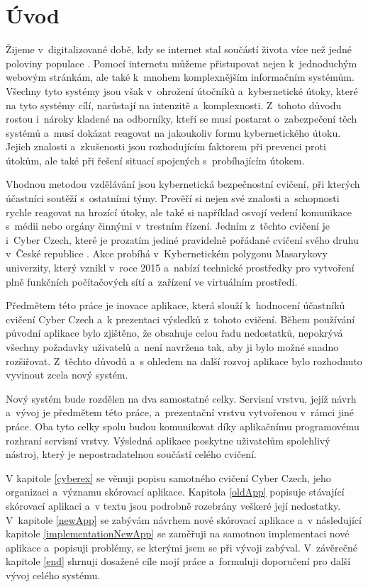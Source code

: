 \documentclass[
  digital,
  twoside,
  table, 
  nolof, 
  nolot
]{fithesis3}
\begin{document}
\chapter*{Úvod}

Žijeme v~digitalizované době, kdy se internet stal součástí života více než jedné poloviny populace \cite{worldStats}. Pomocí internetu můžeme přistupovat nejen k~jednoduchým webovým stránkám, ale také k~mnohem komplexnějším informačním systémům. Všechny tyto systémy jsou však v~ohrožení útočníků a~kybernetické útoky, které na tyto systémy cílí, narůstají na intenzitě a~komplexnosti. Z~tohoto důvodu rostou i~nároky kladené na odborníky, kteří se musí postarat o~zabezpečení těch systémů a~musí dokázat reagovat na jakoukoliv formu kybernetického útoku. Jejich znalosti a~zkušenosti jsou rozhodujícím faktorem při prevenci proti útokům, ale také při řešení situací spojených s~probíhajícím útokem.

Vhodnou metodou vzdělávání jsou kybernetická bezpečnostní cvičení, při kterých účastníci soutěží s~ostatními týmy. Prověří si nejen své znalosti a~schopnosti rychle reagovat na hrozící útoky, ale také si například osvojí vedení komunikace s~médii nebo orgány činnými v~trestním řízení. Jedním z~těchto cvičení je i~Cyber Czech, které je prozatím jediné pravidelně pořádané cvičení svého druhu v~České republice \cite{cyberex}. Akce probíhá v~Kybernetickém polygonu Masarykovy univerzity, který vznikl v~roce 2015 a~nabízí technické prostředky pro vytvoření plně funkčních počítačových sítí a~zařízení ve virtuálním prostředí.

Předmětem této práce je inovace aplikace, která slouží k~hodnocení účastníků cvičení Cyber Czech a~k prezentaci výsledků z~tohoto cvičení. Během používání původní aplikace bylo zjištěno, že obsahuje celou řadu nedostatků, nepokrývá všechny požadavky uživatelů a~není navržena tak, aby ji bylo možné snadno rozšiřovat. Z~těchto důvodů a~s ohledem na další rozvoj aplikace bylo rozhodnuto vyvinout zcela nový systém. 

Nový systém bude rozdělen na dva samostatné celky. Servisní vrstvu, jejíž návrh a~vývoj je předmětem této práce, a~prezentační vrstvu vytvořenou v~rámci jiné práce. Oba tyto celky spolu budou komunikovat díky aplikačnímu programovému rozhraní servisní vrstvy. Výsledná aplikace poskytne uživatelům spolehlivý nástroj, který je nepostradatelnou součástí celého cvičení. 

V kapitole \ref{cyberex} se věnuji popisu samotného cvičení Cyber Czech, jeho organizaci a~významu skórovací aplikace. Kapitola \ref{oldApp} popisuje stávající skórovací aplikaci a~v textu jsou podrobně rozebrány veškeré její nedostatky. V~kapitole \ref{newApp} se zabývám návrhem nové skórovací aplikace a~v následující kapitole \ref{implementationNewApp} se zaměřuji na samotnou implementaci nové aplikace a~popisuji problémy, se kterými jsem se při vývoji zabýval. V~závěrečné kapitole \ref{end} shrnuji dosažené cíle mojí práce a~formuluji doporučení pro další vývoj celého systému.
\end{document}
